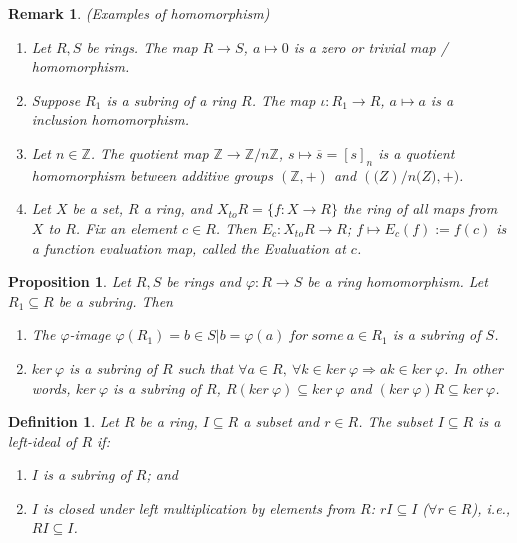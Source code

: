 \documentclass[a4paper,8pt]{article}
\theoremstyle{theorem}
\newtheorem{proposition}[theorem]{Proposition}
\newtheorem{definition}[theorem]{Definition}
\newtheorem{remark}[theorem]{Remark}
\begin{document}
\begin{remark}
\textit{{\color{blue} (Examples of homomorphism)}}\\
\begin{enumerate}[label=(\roman*)]
\item Let $R, S$ be rings. The map $R \rightarrow S$, $a \mapsto 0$ is a \textit{{\color{blue} zero or trivial map / homomorphism}}.
\item Suppose $R_1$ is a subring of a ring $R$. The map $\iota: R_1 \rightarrow R$, $a \mapsto a$ is a \textit{{\color{blue} inclusion homomorphism}}.
\item Let $n \in \mathbb{Z}$. The quotient map $\mathbb{Z} \rightarrow \mathbb{Z}/n\mathbb{Z}$, $s \mapsto \overline{s} = [s]_n $ is a \textit{{\color{blue} quotient homomorphism}} between additive groups $(\mathbb{Z}, +)$ and $(\mathbb(Z)/n\mathbb(Z), +)$.
\item Let $X$ be a set, $R$ a ring, and $X_{to}R = \{f: X \rightarrow R\}$ the ring of all maps from $X$ to $R$. Fix an element $c\in R$. Then $E_c: X_{to}R \rightarrow R$; $f \mapsto E_c(f) := f(c)$ is a \textit{{\color{blue} function evaluation map}}, called the \textit{{\color{blue} Evaluation at $c$}}.
\end{enumerate}
\end{remark}


\begin{proposition}
Let $R, S$ be rings and $\varphi: R \rightarrow S$ be a ring homomorphism. Let $R_1 \subseteq R$ be a subring. Then
\begin{enumerate}[label=(\roman*)]
\item The $\varphi$-image $\varphi(R_1) = {b \in S | b = \varphi(a) \ for \ some \ a \in R_1}$ is a subring of $S$.
\item $ker \ \varphi$ is a subring of $R$ such that $\forall a \in R, \ \forall k \in ker \ \varphi \Rightarrow ak \in ker \ \varphi$. In other words, $ker \ \varphi$ is a subring of $R$, $R(ker \ \varphi) \subseteq ker \ \varphi$ and $(ker \ \varphi)R \subseteq ker \ \varphi$.
\end{enumerate}
\end{proposition}


\begin{definition}
Let $R$ be a ring, $I \subseteq R$ a subset and $r \in R$. The subset $I \subseteq R$ is a \textit{{\color{blue} left-ideal}} of $R$ if:
\begin{enumerate}[label=(\roman*)]
\item $I$ is a subring of $R$; and
\item $I$ is closed under left multiplication by elements from $R$: $rI \subseteq I$ ($\forall r \in R$), i.e., $RI \subseteq I$.
\end{enumerate}
\end{definition}
\end{document}
